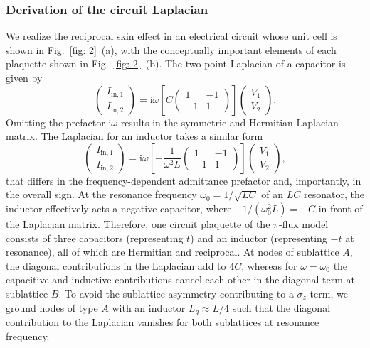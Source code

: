 \subsubsection{Derivation of the circuit Laplacian}
\label{sec:circ-laplacian}
We realize the reciprocal skin effect in an electrical circuit whose unit cell is shown in Fig.~\ref{fig: 2}~(a), with the conceptually important elements of each plaquette shown in Fig.~\ref{fig: 2}~(b). The two-point Laplacian of a capacitor is given by
\begin{equation}
\begin{pmatrix}
I_{\text{in},1}\\I_{\text{in},2} 
\end{pmatrix}
=\mathrm{ i} \omega \left[ C 
\begin{pmatrix}
1 & -1 \\ -1 & 1
\end{pmatrix}
\right]
\begin{pmatrix}
V_1 \\ V_2
\end{pmatrix} .
\end{equation}
Omitting the prefactor $\mathrm{i} \omega$ results in the symmetric and Hermitian Laplacian matrix. The Laplacian for an inductor takes a similar form
\begin{equation}
\begin{pmatrix}
I_{\text{in},1}\\I_{\text{in},2} 
\end{pmatrix}
= \mathrm{i} \omega \left[ - \frac{1}{\omega^2 L}
\begin{pmatrix}
1 & -1 \\ -1 & 1
\end{pmatrix}
\right]
\begin{pmatrix}
V_1 \\ V_2
\end{pmatrix} ,
\end{equation}
that differs in the frequency-dependent admittance prefactor and, importantly, in the overall sign. At the resonance frequency $\omega_0 = 1/\sqrt{L C}$ of an $LC$ resonator, the inductor effectively acts a negative capacitor, where $-1/(\omega_0^2 L) = -C$ in front of the Laplacian matrix. Therefore, one circuit plaquette of the $\pi$-flux model consists of three capacitors (representing $t$) and an inductor (representing $-t$ at resonance), all of which are Hermitian and reciprocal. At nodes of sublattice $A$, the diagonal contributions in the Laplacian add to $4 C$, whereas for $\omega = \omega_0$ the capacitive and inductive contributions cancel each other in the diagonal term at sublattice $B$. To avoid the sublattice asymmetry contributing to a $\sigma_z$ term, we ground nodes of type $A$ with an inductor $L_g \approx L/4$ such that the diagonal contribution to the Laplacian vanishes for both sublattices at resonance frequency.
